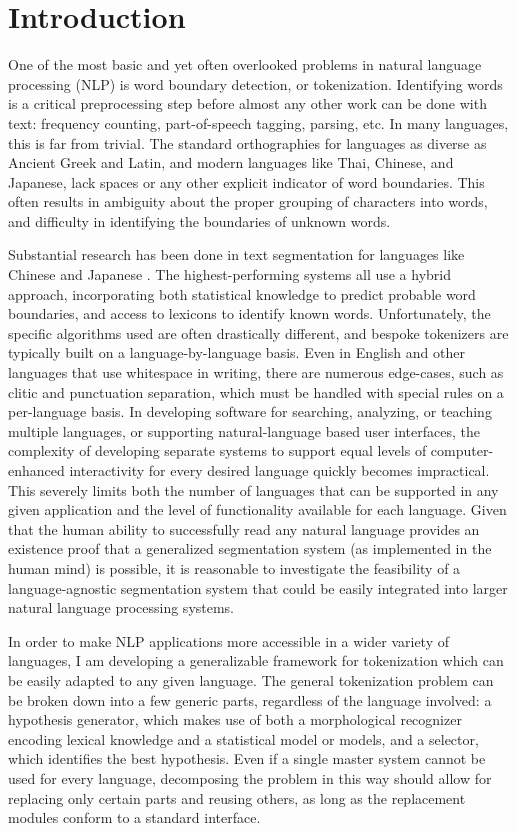 \chapter{Introduction}

One of the most basic and yet often overlooked problems in natural language processing (NLP) is word boundary detection, or tokenization. Identifying words is a critical preprocessing step before almost any other work can be done with text: frequency counting, part-of-speech tagging, parsing, etc.
In many languages, this is far from trivial. The standard orthographies for languages as diverse as Ancient Greek and Latin, and modern languages like Thai, Chinese, and Japanese, lack spaces or any other explicit indicator of word boundaries. This often results in ambiguity about the proper grouping of characters into words, and difficulty in identifying the boundaries of unknown words.

Substantial research has been done in text segmentation for languages like Chinese \cite{peng04} and Japanese \cite{suzuki00}. The highest-performing systems all use a hybrid approach, incorporating both statistical knowledge to predict probable word boundaries, and access to lexicons to identify known words. Unfortunately, the specific algorithms used are often drastically different, and bespoke tokenizers are typically built on a language-by-language basis. Even in English and other languages that use whitespace in writing, there are numerous edge-cases, such as clitic and punctuation separation, which must be handled with special rules on a per-language basis. In developing software for searching, analyzing, or teaching multiple languages, or supporting natural-language based user interfaces, the complexity of developing separate systems to support equal levels of computer-enhanced interactivity for every desired language quickly becomes impractical. This severely limits both the number of languages that can be supported in any given application and the level of functionality available for each language. Given that the human ability to successfully read any natural language provides an existence proof that a generalized segmentation system (as implemented in the human mind) is possible, it is reasonable to investigate the feasibility of a language-agnostic segmentation system that could be easily integrated into larger natural language processing systems.

In order to make NLP applications more accessible in a wider variety of languages, I am developing a generalizable framework for tokenization which can be easily adapted to any given language. The general tokenization problem can be broken down into a few generic parts, regardless of the language involved: a hypothesis generator, which makes use of both a morphological recognizer encoding lexical knowledge and a statistical model or models, and a selector, which identifies the best hypothesis. Even if a single master system cannot be used for every language, decomposing the problem in this way should allow for replacing only certain parts and reusing others, as long as the replacement modules conform to a standard interface.


